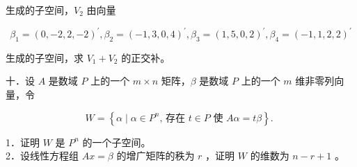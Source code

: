 \documentclass{article}
\begin{document}
生成的子空间，\(V_{2}\) 由向量

\[
\beta_{1}=(0,-2,2,-2)^{\prime}, \beta_{2}=(-1,3,0,4)^{\prime}, \beta_{3}=(1,5,0,2)^{\prime}, \beta_{4}=(-1,1,2,2)^{\prime}
\]

生成的子空间，求 \(V_{1}+V_{2}\) 的正交补。

十．设 \(A\) 是数域 \(P\) 上的一个 \(m \times n\) 矩阵，\(\beta\) 是数域 \(P\) 上的一个 \(m\) 维非零列向量，令

\[
W=\left\{\alpha \mid \alpha \in P^{n} \text {, 存在 } t \in P \text { 使 } A \alpha=t \beta\right\} \text {. }
\]

1．证明 \(W\) 是 \(P^{n}\) 的一个子空间。\\

2．设线性方程组 \(A x=\beta\) 的增广矩阵的秩为 \(r\) ，证明 \(W\) 的维数为 \(n-r+1\) 。
\end{document}
